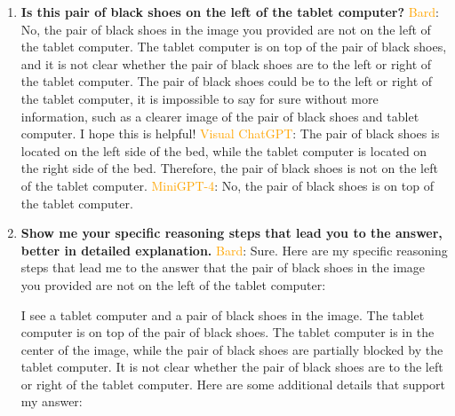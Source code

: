 \begin{enumerate}
    Do you have other questions or requests?
    \subitem \textcolor{orange}{Visual ChatGPT}: The pair of black shoes is located on the left side of the bed, while the tablet computer is located on the right side of the bed.
    \subitem \textcolor{orange}{MiniGPT-4}: The black shoes are on top of the tablet computer on the bed.
    \item \textbf{Is this pair of black shoes on the left of the tablet computer?}
    \subitem \textcolor{orange}{Bard}: 
    No, the pair of black shoes in the image you provided are not on the left of the tablet computer. The tablet computer is on top of the pair of black shoes, and it is not clear whether the pair of black shoes are to the left or right of the tablet computer.
    The pair of black shoes could be to the left or right of the tablet computer, it is impossible to say for sure without more information, such as a clearer image of the pair of black shoes and tablet computer.
    I hope this is helpful! 
    \subitem \textcolor{orange}{Visual ChatGPT}: The pair of black shoes is located on the left side of the bed, while the tablet computer is located on the right side of the bed. Therefore, the pair of black shoes is not on the left of the tablet computer.
    \subitem \textcolor{orange}{MiniGPT-4}: No, the pair of black shoes is on top of the tablet computer.
    \item \textbf{Show me your specific reasoning steps that lead you to the answer, better in detailed explanation.}
    \subitem \textcolor{orange}{Bard}: Sure. Here are my specific reasoning steps that lead me to the answer that the pair of black shoes in the image you provided are not on the left of the tablet computer:

    I see a tablet computer and a pair of black shoes in the image.
    The tablet computer is on top of the pair of black shoes.
    The tablet computer is in the center of the image, while the pair of black shoes are partially blocked by the tablet computer.
    It is not clear whether the pair of black shoes are to the left or right of the tablet computer.
    Here are some additional details that support my answer:
    

\end{enumerate}
